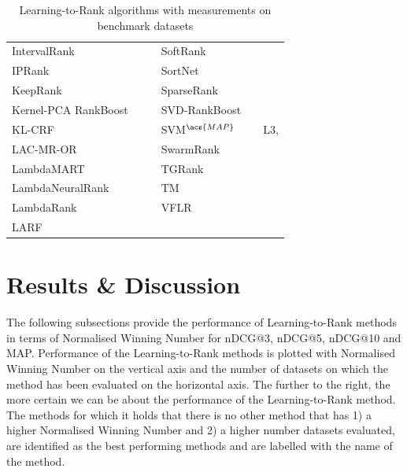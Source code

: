 \begin{table}[!h!p]
{\begin{tabular}{|l|l|l||l|l|l|}
IntervalRank & \cite{Moon2010} & \cite{Moon2010, Freno2011} & SoftRank & \cite{Taylor2008, Guiver2008} & \cite{Qin2010b} \\ 
\acs{IP}Rank & \cite{Wang2009b} & \cite{Wang2009b, Torkestani2012} & SortNet & \cite{Rigutini2008} & \cite{Rigutini2008,Freno2011} \\
KeepRank & \cite{Chen2009} & \cite{Chen2009} & SparseRank & \cite{Lai2013b} & \cite{Lai2013b} \\ 
Kernel-\acs{PCA} RankBoost & \cite{Duh2008} & \cite{Duh2008, Sato2013} & \acs{SVD}-RankBoost & \cite{Lin2009} & \cite{Lin2009} \\
KL-\acs{CRF} & \cite{Volkovs2011} & \cite{Volkovs2011} & \acs{SVM}$^{\acs{MAP}}$ & \cite{Yue2007} & L3, \cite{Wang2012, Xu2008, Niu2012} \\ 
LAC-MR-OR & \cite{Veloso2008} & \cite{Veloso2008} & SwarmRank & \cite{Diaz-Aviles2009} & \cite{Sato2013} \\ 
LambdaMART & \cite{Burges2010} & \cite{Asadi2013a, Ganjisaffar2011c} & TGRank & \cite{Lai2013} & \cite{Lai2013} \\ 
LambdaNeuralRank & \cite{Papini2012} & \cite{Papini2012} & TM & \cite{Zhou2008} & \cite{Zhou2008, Papini2012, Tan2013} \\ 
LambdaRank & \cite{Burges2006} &  & VFLR & \cite{Cai2012} & \cite{Cai2012} \\ 
LARF & \cite{Torkestani2012} & \cite{Torkestani2012} &  &  &  \\ 
\end{tabular}}
\caption{Learning-to-Rank algorithms with measurements on benchmark datasets}
\label{tab:ltr_methods_used}
\end{table}

\section{Results \& Discussion}
The following subsections provide the performance of Learning-to-Rank methods in terms of Normalised Winning Number for \ac{nDCG}@3, \ac{nDCG}@5, \ac{nDCG}@10 and \ac{MAP}. Performance of the Learning-to-Rank methods is plotted with Normalised Winning Number on the vertical axis and the number of datasets on which the method has been evaluated on the horizontal axis. The further to the right, the more certain we can be about the performance of the Learning-to-Rank method. The methods for which it holds that there is no other method that has 1) a higher Normalised Winning Number and 2) a higher number datasets evaluated, are identified as the best performing methods and are labelled with the name of the method.

